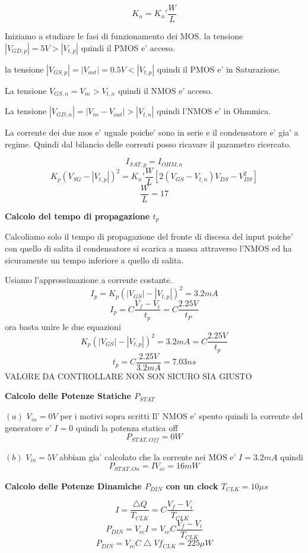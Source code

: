 \documentclass[\main/main.tex]{subfiles}
\begin{document}
\[ K_n = K_n' \frac{W}{L} \]

Iniziamo a studiare le fasi di funzionamento dei MOS.
la tensione $|V_{GD,p}| = 5V > |V_{t,p}|$ quindi il PMOS e' acceso.

la tensione $|V_{GS,p}| = |V_{out}| = 0.5V < |V_{t,p}|$ quindi il PMOS e' in Saturazione.

La tensione $V_{GS,n} = V_{in} > V_{t,n}$ quindi il NMOS e' acceso.

La tensione $|V_{GD,n}| = |V_{in} - V_{out}| > |V_{t,n}|$ quindi l'NMOS e' in Ohmmica.

La corrente dei due mos e' uguale poiche' sono in serie e il condensatore e' gia' a regime.
Quindi dal bilancio delle correnti posso ricavare il parametro ricercato.

\[I_{SAT,p} = I_{OHM,n}\]
\[K_p \left(V_{SG} - |V_{t,p}| \right)^2 = K_n' \frac{W}{L} \left[ 2 \left( V_{GS} - V_{t,n} \right) V_{DS} - V_{DS}^2 \right]\]
\[\frac{W}{L} = 17\]

\textbf{Calcolo del tempo di propagazione $t_p$}

Calcoliamo solo il tempo di propagazione del fronte di discesa del input poiche' con quello di salita il condensatore si scarica a massa attraverso l'NMOS ed ha sicuramente un tempo inferiore a quello di salita.

Usiamo l'approssimazione a corrente costante.
\[I_p = K_p \left(|V_{GS}| - |V_{t,p}| \right)^2 = 3.2mA\]
\[I_p = C \frac{V_f - V_i}{t_p} = C \frac{2.25V}{t_P}\]
ora basta unire le due equazioni
\[ K_p \left(|V_{GS}| - |V_{t,p}| \right)^2 = 3.2mA = C \frac{2.25V}{t_p}\]
\[t_p = C \frac{2.25V}{3.2mA} = 7.03ns\]
VALORE DA CONTROLLARE NON SON SICURO SIA GIUSTO

\clearpage
\textbf{Calcolo delle Potenze Statiche $P_{STAT}$}

$(a)$ $V_{in} = 0V$ per i motivi sopra scritti Il' NMOS e' spento quindi la corrente del generatore e' $I = 0$ quindi la potenza statica off
\[P_{STAT,Off} = 0W\]

$(b)$ $V_{in} = 5V$ abbiam gia' calcolato che la corrente nei MOS e' $I = 3.2mA$ quindi
\[ P_{STAT,On} = I V_{cc} = 16mW\]

\textbf{Calcolo delle Potenze Dinamiche $P_{DIN}$ con un clock $T_{CLK} = 10 \mu s$}

\[ I = \frac{\bigtriangleup Q}{T_{CLK}} = C \frac{V_f - V_i}{T_{CLK}}\]
\[ P_{DIN} = V_{cc} I = V_{cc} C \frac{V_f - V_i}{T_{CLK}}\]
\[ P_{DIN} = V_{cc} C \bigtriangleup V f_{CLK} = 225 \mu W\]
\end{document}
